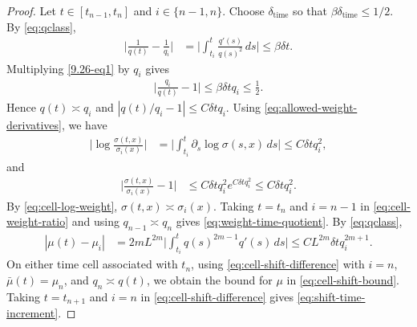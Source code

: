 \documentclass[print,wide,eng]{draft}
\begin{document}
\begin{proof}
Let $t\in[t_{n-1},t_n]$ and $i\in\{n-1,n\}$. Choose $\delta_{\mathrm{time}}$ so that $\beta\delta_{\mathrm{time}}\leq1/2$. By \cref{eq:qclass},\vspace{-2mm}
%
\begin{align}\label{9.26-eq1}
\bigg|\frac1{q(t)}-\frac1{q_i}\bigg|
&=\bigg|\int_{t_i}^t\frac{q'(s)}{q(s)^2}\,ds\bigg|\leq\beta {\delta t}.
\end{align}
%
Multiplying \eqref{9.26-eq1} by $q_i$ gives\vspace{-2mm}
%
\begin{align*}
\bigg|\frac{q_i}{q(t)}-1\bigg|\leq\beta {\delta t}q_i\leq\frac{1}{2}.
\end{align*}
%
Hence $q(t)\asymp q_i$ and $|q(t)/q_i-1|\leq C{\delta t}q_i$.
Using \cref{eq:allowed-weight-derivatives}, we have
%
\begin{align}\label{eq:cell-log-weight}
\bigg|\log\frac{\sigma(t,x)}{\sigma_i(x)}\bigg|
&=\bigg|\int_{t_i}^t\partial_s\log\sigma(s,x)\,ds\bigg|\leq C{\delta t}q_i^2,
\end{align}
%
and\vspace{-2mm}
%
\begin{align}\label{eq:cell-weight-ratio}
\Big|\frac{\sigma(t,x)}{\sigma_i(x)}-1\Big|
&\leq C{\delta t}q_i^2 e^{C{\delta t}q_i^2}\leq C{\delta t}q_i^2.
\end{align}
%
By \cref{eq:cell-log-weight}, $\sigma(t,x)\asymp\sigma_i(x)$. Taking $t=t_n$ and $i=n-1$ in \cref{eq:cell-weight-ratio} and using $q_{n-1}\asymp q_n$ gives \cref{eq:weight-time-quotient}. By \cref{eq:qclass},
%
\begin{align}\label{eq:cell-shift-difference}
|\mu(t)-\mu_i|
&=2mL^{2m}\Big|\int_{t_i}^t q(s)^{2m-1}q'(s)\,ds\Big|
\leq CL^{2m}{\delta t}q_i^{2m+1}.
\end{align}
%
On either time cell associated with $t_n$, using \cref{eq:cell-shift-difference} with $i=n$, $\bar\mu(t)=\mu_n$, and $q_n\asymp q(t)$, we obtain the bound for $\mu$ in \cref{eq:cell-shift-bound}. Taking $t=t_{n+1}$ and $i=n$ in \cref{eq:cell-shift-difference} gives \cref{eq:shift-time-increment}.
\end{proof}
%
\end{document}
